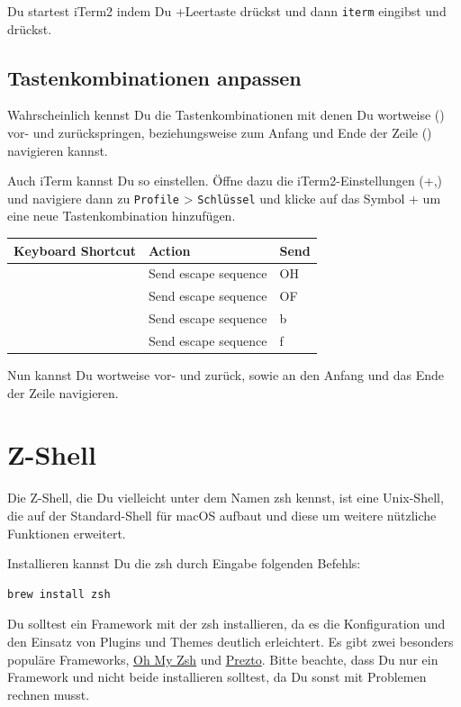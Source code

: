 \documentclass[]{article}
\newcommand{\code}[1]{\texttt{#1}}
\begin{document}
Du startest iTerm2 indem Du \cmdkey+Leertaste drückst und dann \code{iterm} eingibst und \returnkey\, drückst.

\subsection{Tastenkombinationen anpassen}
Wahrscheinlich kennst Du die Tastenkombinationen mit denen Du wortweise (\optkey) vor- und zurückspringen, beziehungsweise zum Anfang und Ende der Zeile (\cmdkey) navigieren kannst.

Auch iTerm kannst Du so einstellen. Öffne dazu die iTerm2-Einstellungen (\cmdkey +,) und navigiere dann zu \code{Profile} > \code{Schlüssel} und klicke  auf das Symbol +  um eine neue Tastenkombination hinzufügen.

\begin{tabular}[t]{lll}
	\toprule
	Keyboard Shortcut & Action & Send \\
	\midrule
	\cmdkey \textleftarrow & Send escape sequence & OH \\
	\cmdkey \textrightarrow & Send escape sequence & OF \\
	\optkey \textleftarrow & Send escape sequence & b \\
	\optkey \textrightarrow & Send escape sequence & f \\
\end{tabular}

Nun kannst Du wortweise vor- und zurück, sowie an den Anfang und das Ende der Zeile navigieren.

\section{Z-Shell}
Die Z-Shell, die Du vielleicht unter dem Namen zsh kennst, ist eine Unix-Shell, die auf der Standard-Shell für macOS aufbaut und diese um weitere nützliche Funktionen erweitert. 

Installieren kannst Du die zsh durch Eingabe folgenden Befehls:
\begin{verbatim}
brew install zsh
\end{verbatim}

Du solltest ein Framework mit der zsh installieren, da es die Konfiguration und den Einsatz von Plugins und Themes deutlich erleichtert. Es gibt zwei besonders populäre Frameworks, \href{https://github.com/robbyrussell/oh-my-zsh}{Oh My Zsh} und \href{https://github.com/sorin-ionescu/prezto}{Prezto}.
Bitte beachte, dass Du nur ein Framework und nicht beide installieren solltest, da Du sonst mit Problemen rechnen musst.
\end{document}
